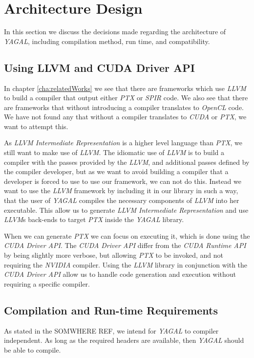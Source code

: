 \section{Architecture Design}
In this section we discuss the decisions made regarding the architecture of \textit{YAGAL}, including compilation method, run time, and compatibility.

\subsection{Using LLVM and CUDA Driver API}
In chapter \ref{cha:relatedWorks} we see that there are frameworks which use \textit{LLVM} to build a compiler that output either \textit{PTX} or \textit{SPIR} code. We also see that there are frameworks that without introducing a compiler translates to \textit{OpenCL} code. We have not found any that without a compiler translates to \textit{CUDA} or \textit{PTX}, we want to attempt this.

As \textit{LLVM Intermediate Representation} is a higher level language than \textit{PTX}, we still want to make use of \textit{LLVM}. The idiomatic use of \textit{LLVM} is to build a compiler with the passes provided by the \textit{LLVM}, and additional passes defined by the compiler developer, but as we want to avoid building a compiler that a developer is forced to use to use our framework, we can not do this. Instead we want to use the \textit{LLVM} framework by including it in our library in such a way, that the user of \textit{YAGAL} compiles the necessary components of \textit{LLVM} into her executable. This allow us to generate \textit{LLVM Intermediate Representation} and use \textit{LLVM}s back-ends to target \textit{PTX} inside the \textit{YAGAL} library.

When we can generate \textit{PTX} we can focus on executing it, which is done using the \textit{CUDA Driver API}. The \textit{CUDA Driver API} differ from the \textit{CUDA Runtime API} by being slightly more verbose, but allowing \textit{PTX} to be invoked, and not requiring the \textit{NVIDIA} compiler. Using the \textit{LLVM} library in conjunction with the \textit{CUDA Driver API} allow us to handle code generation and execution without requiring a specific compiler.

\subsection{Compilation and Run-time Requirements}
As stated in the SOMWHERE REF, we intend for \textit{YAGAL} to compiler independent. As long as the required headers are available, then \textit{YAGAL} should be able to compile. 

